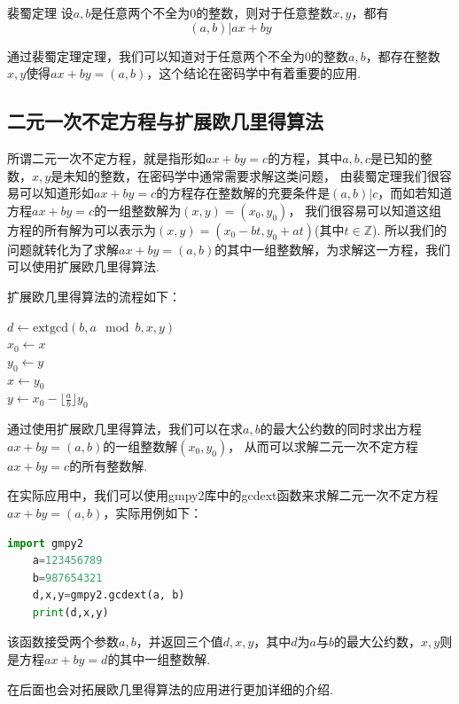 \documentclass{book}
\numberwithin{equation}{subsubsection}
\begin{document}
\begin{concept}{裴蜀定理}
设$a,b$是任意两个不全为$0$的整数，则对于任意整数$x,y$，都有
\begin{equation}
    (a,b)|ax+by
    \nonumber
\end{equation}
\end{concept}
通过裴蜀定理定理，我们可以知道对于任意两个不全为$0$的整数$a,b$，都存在整数$x,y$使得$ax+by=(a,b)$，这个结论在密码学中有着重要的应用.\par

\subsection{二元一次不定方程与扩展欧几里得算法}
所谓二元一次不定方程，就是指形如$ax+by=c$的方程，其中$a,b,c$是已知的整数，$x,y$是未知的整数，在密码学中通常需要求解这类问题，
由裴蜀定理我们很容易可以知道形如$ax+by=c$的方程存在整数解的充要条件是$(a,b)|c$，而如若知道方程$ax+by=c$的一组整数解为$(x,y)=(x_0,y_0)$，
我们很容易可以知道这组方程的所有解为可以表示为$(x,y)=(x_0-bt,y_0+at)$(其中$t\in \mathbb{Z}$).
所以我们的问题就转化为了求解$ax+by=(a,b)$的其中一组整数解，为求解这一方程，我们可以使用扩展欧几里得算法.\par
扩展欧几里得算法的流程如下：
\begin{algorithm}
    \caption{扩展欧几里得算法$\text{extgcd}(a,b,x,y)$}
    $d\leftarrow \text{extgcd}(b,a\mod b,x,y)$\\
    $x_0\leftarrow x$\\
    $y_0\leftarrow y$\\
    $x\leftarrow y_0$\\
    $y\leftarrow x_0-\lfloor \frac{a}{b}\rfloor y_0$\\
\end{algorithm}\par
通过使用扩展欧几里得算法，我们可以在求$a,b$的最大公约数的同时求出方程$ax+by=(a,b)$的一组整数解$(x_0,y_0)$，
从而可以求解二元一次不定方程$ax+by=c$的所有整数解.\par
在实际应用中，我们可以使用gmpy2库中的gcdext函数来求解二元一次不定方程$ax+by=(a,b)$，实际用例如下：
\begin{lstlisting}[language=Python,basicstyle=\ttfamily,breaklines=true,keywordstyle=\bfseries\color{blue}]
    import gmpy2
    a=123456789
    b=987654321
    d,x,y=gmpy2.gcdext(a, b)
    print(d,x,y)
\end{lstlisting}
该函数接受两个参数$a,b$，并返回三个值$d,x,y$，其中$d$为$a$与$b$的最大公约数，$x,y$则是方程$ax+by=d$的其中一组整数解.\par
在后面也会对拓展欧几里得算法的应用进行更加详细的介绍.\par
\end{document}
